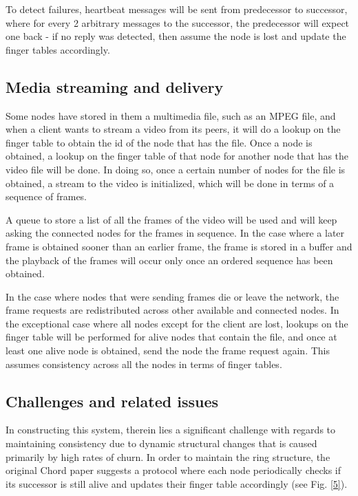 \documentclass[fleqn,24pt]{SelfArx} %
\begin{document}
To detect failures, heartbeat messages will be sent from predecessor to successor, where for every 2 arbitrary messages to the successor, the predecessor will expect one back - if no reply was detected, then assume the node is lost and update the finger tables accordingly.

\subsection{Media streaming and delivery}

Some nodes have stored in them a multimedia file, such as an MPEG file, and when a client wants to stream a video from its peers, it will do a lookup on the finger table to obtain the id of the node that has the file. Once a node is obtained, a lookup on the finger table of that node for another node that has the video file will be done. In doing so, once a certain number of nodes for the file is obtained, a stream to the video is initialized, which will be done in terms of a sequence of frames. 

A queue to store a list of all the frames of the video will be used and will keep asking the connected nodes for the frames in sequence. In the case where a later frame is obtained sooner than an earlier frame, the frame is stored in a buffer and the playback of the frames will occur only once an ordered sequence has been obtained. 

In the case where nodes that were sending frames die or leave the network, the frame requests are redistributed across other available and connected nodes. In the exceptional case where all nodes except for the client are lost, lookups on the finger table will be performed for alive nodes that contain the file, and once at least one alive node is obtained, send the node the frame request again. This assumes consistency across all the nodes in terms of finger tables.

\subsection{Challenges and related issues}

In constructing this system, therein lies a significant challenge with regards to maintaining consistency due to dynamic structural changes that is caused primarily by high rates of churn. In order to maintain the ring structure, the original Chord paper \cite{2} suggests a protocol where each node periodically checks if its successor is still alive and updates their finger table accordingly (see Fig. \ref{5}).
\end{document}
